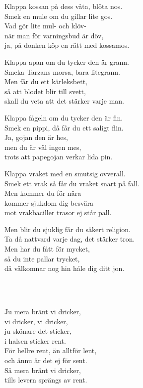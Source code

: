 \songtext{}Klappa kossan på dess våta, blöta nos.\\ 
Smek en mule om du gillar lite gos.\\ 
Vad gör lite mul- och klöv-\\ 
när man för varningsbud är döv, \\
ja, på donken köp en rätt med kossamos.

Klappa apan om du tycker den är grann.\\ 
Smeka Tarzans morsa, bara litegrann.\\ 
Men får du ett kärleksbett,\\ 
så att blodet blir till svett,\\ 
skall du veta att det stärker varje man.

Klappa fågeln om du tycker den är fin.\\
Smek en pippi, då får du ett saligt flin.\\ 
Ja, gojan den är hes,\\ 
men du är väl ingen mes,\\ 
trots att papegojan verkar lida pin.

Klappa vraket med en smutsig ovverall.\\ 
Smek ett vrak så får du vraket snart på fall.\\ 
Men kommer du för nära\\ 
kommer sjukdom dig besvära\\ 
mot vrakbaciller trasor ej står pall.

Men blir du sjuklig får du säkert religion.\\ 
Ta då nattvard varje dag, det stärker tron.\\ 
Men har du fått för mycket,\\ 
så du inte pallar trycket,\\ 
då välkomnar nog hin håle dig ditt jon.

\\



 \\       
\author{Text: Martin Johnsson}

\songtext{} 
Ju mera bränt vi dricker,\\
vi dricker, vi dricker,\\
ju skönare det sticker,\\
i halsen sticker rent.\\
För hellre rent, än alltför lent,\\
och ännu är det ej för sent.\\
Så mera bränt vi dricker,\\
tills levern sprängs av rent.\\

